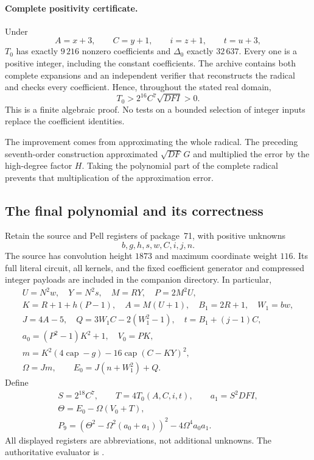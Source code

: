 \paragraph{Complete positivity certificate.}
Under
\[
 A=x+3,\qquad C=y+1,\qquad i=z+1,\qquad t=u+3,
\]
$T_0$ has exactly $9\,216$ nonzero coefficients and $\Delta_0$ exactly
$32\,637$. Every one is a positive integer, including the constant
coefficients. The archive contains both complete expansions and an
independent verifier that reconstructs the radical and checks every
coefficient. Hence, throughout the stated real domain,
\begin{equation}
 T_0>2^{16}C^7\sqrt{DFI}>0.
 \label{eq:full-root-bound}
\end{equation}
This is a finite algebraic proof. No tests on a bounded selection of
integer inputs replace the coefficient identities.

The improvement comes from approximating the whole radical. The preceding
seventh-order construction approximated $\sqrt{DF}\,G$ and multiplied the
error by the high-degree factor $H$. Taking the polynomial part of the
complete radical prevents that multiplication of the approximation error.

\subsection{The final polynomial and its correctness}

Retain the source and Pell registers of package~71, with positive unknowns
\[
 b,g,h,s,w,C,i,j,n.
\]
The source has convolution height $1873$ and maximum coordinate weight
$116$. Its full literal circuit, all kernels, and the fixed coefficient
generator and compressed integer payloads are included in the companion
directory. In particular,
\begin{gather*}
 U=N^2w,\quad Y=N^2s,\quad M=RY,\quad P=2M^2U,\\
 K=R+1+h(P-1),\quad A=M(U+1),\quad B_1=2R+1,\quad W_1=bw,\\
 J=4A-5,\quad Q=3W_1C-2(W_1^2-1),\quad t=B_1+(j-1)C,\\
 a_0=(P^2-1)K^2+1,\quad V_0=PK,\\
 m=K^2(4\operatorname{cap}-g)
      -16\operatorname{cap}(C-KY)^2,\\
 \Omega=Jm,\qquad E_0=J(n+W_1^2)+Q.
\end{gather*}
Define
\begin{gather*}
 S=2^{18}C^7,\qquad T=4T_0(A,C,i,t),\qquad a_1=S^2DFI,\\
 \Theta=E_0-\Omega(V_0+T),\\
 \boxed{\displaystyle
 P_9=(\Theta^2-\Omega^2(a_0+a_1))^2
                -4\Omega^4a_0a_1.}
\end{gather*}
All displayed registers are abbreviations, not additional unknowns.
The authoritative evaluator is
.

